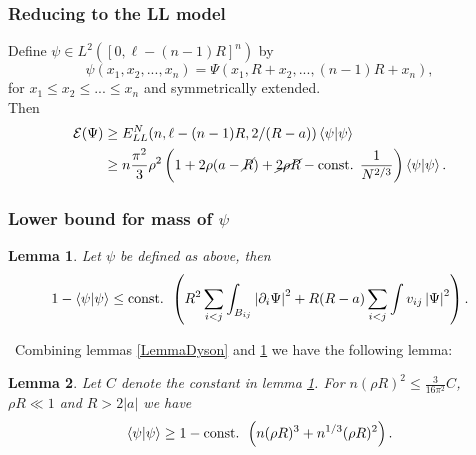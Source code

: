 \documentclass{beamer}[10]
\newcommand{\abs}[1]{\left\lvert #1 \right\rvert}
\renewcommand{\braket}[1]{\left\langle#1\right\rangle}
\newtheorem{mlemma}{Lemma}
\begin{document}
\begin{frame}
	\frametitle{Reducing to the LL model}
	\begin{block}{}
		\vspace{-0.5cm}
		Define $ \psi\in L^2([0,\ell-(n-1)R]^n) $ by 
			$$ \psi(x_1,x_2,...,x_n)=\Psi(x_1,R+x_2,...,(n-1)R+x_n), $$
			 for $ x_1\leq x_2\leq...\leq x_n $ and symmetrically extended.\\\vspace{0.2cm}
			 Then \begin{equation}
			 \begin{aligned}
			 \mathcal{E}(\Psi)&\geq E^N_{LL}(n,\ell-(n-1)R,2/(R-a))\braket{\psi|\psi}\\
			 &\geq n\frac{\pi^2}{3}\rho^2\left(1+2\rho(a-\cancel{R})+\cancel{2\rho R}-\text{const. }\frac{1}{N^{2/3}}\right)\braket{\psi|\psi}.
			 \end{aligned}
			 \end{equation}
	\end{block}	
\end{frame}

\begin{frame}
	\frametitle{Lower bound for mass of $ \psi $}
	\begin{block}{}\vspace{-0.5cm}
			\small\begin{mlemma}\label{LemmaNormLoss}
				Let $ \psi $ be defined as above, then \begin{equation}
				1-\braket{\psi|\psi}\leq\textnormal{const. } \left(R^2\sum_{i<j}\int_{B_{ij}}\abs{\partial_i \Psi}^2+R(R-a)\sum_{i<j}\int v_{ij} \abs{\Psi}^2\right).
				\end{equation}
			\end{mlemma}
			\
			Combining lemmas \ref{LemmaDyson} and \ref{LemmaNormLoss} we have the following lemma:
			\begin{mlemma}\label{LemmaImprovedMassBound}
				Let $ C $ denote the constant in lemma \ref{LemmaNormLoss}. For $ n(\rho R)^2\leq  \frac{3}{16\pi^2}C $, $ \rho R\ll 1 $ and $ R>2\abs{a} $ we have
				\begin{equation}\label{EqImprovedMassBound}
				\begin{aligned}
				\braket{\psi|\psi} \geq 1-\textnormal{const. }\left(n(\rho R)^3+n^{1/3}(\rho R)^2\right).
				\end{aligned}
				\end{equation}
			\end{mlemma}
	\end{block}	
\end{frame}
\end{document}
